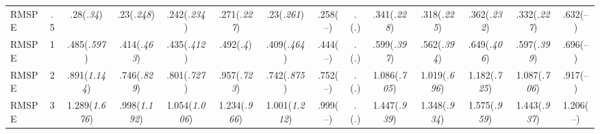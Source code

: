 \documentclass{article}
\begin{document}
\begin{table}[tbp]
{\begin{tabularx}{\textwidth}{lCCCCCCCCCCCCC}
\midrule RMSPE&.5&.28\newline (\emph{.34})&.23\newline (\emph{.248})&.242\newline (\emph{.234})&.271\newline (\emph{.227})&.23\newline (\emph{.261})&.258\newline (--)&.\newline (\emph{.})&.341\newline (\emph{.228})&.318\newline (\emph{.225})&.362\newline (\emph{.232})&.332\newline (\emph{.227})&.632\newline (--) \tabularnewline
RMSPE&1&.485\newline (\emph{.597})&.414\newline (\emph{.463})&.435\newline (\emph{.412})&.492\newline (\emph{.4})&.409\newline (\emph{.464})&.444\newline (--)&.\newline (\emph{.})&.599\newline (\emph{.397})&.562\newline (\emph{.394})&.649\newline (\emph{.406})&.597\newline (\emph{.399})&.696\newline (--) \tabularnewline
RMSPE&2&.891\newline (\emph{1.144})&.746\newline (\emph{.829})&.801\newline (\emph{.727})&.957\newline (\emph{.723})&.742\newline (\emph{.875})&.752\newline (--)&.\newline (\emph{.})&1.086\newline (\emph{.705})&1.019\newline (\emph{.696})&1.182\newline (\emph{.725})&1.087\newline (\emph{.706})&.917\newline (--) \tabularnewline
RMSPE&3&1.289\newline (\emph{1.676})&.998\newline (\emph{1.192})&1.054\newline (\emph{1.006})&1.234\newline (\emph{.966})&1.001\newline (\emph{1.212})&.999\newline (--)&.\newline (\emph{.})&1.447\newline (\emph{.939})&1.348\newline (\emph{.934})&1.575\newline (\emph{.959})&1.443\newline (\emph{.937})&1.206\newline (--) \tabularnewline

\end{tabularx}}
\end{table}
\end{document}
